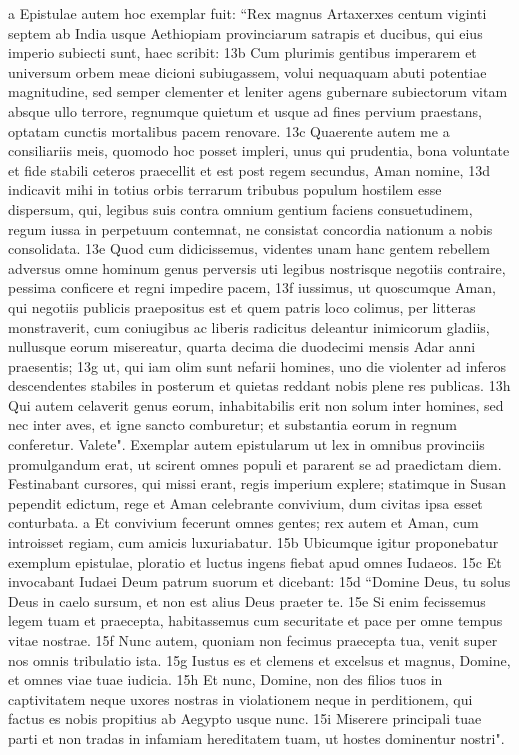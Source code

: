 \begin{biblechapter}
\verse a Epistulae autem hoc exemplar fuit: “Rex magnus Artaxerxes centum viginti septem ab India usque Aethiopiam provinciarum satrapis et ducibus, qui eius imperio subiecti sunt, haec scribit: 13b Cum plurimis gentibus imperarem et universum orbem meae dicioni subiugassem, volui nequaquam abuti potentiae magnitudine, sed semper clementer et leniter agens gubernare subiectorum vitam absque ullo terrore, regnumque quietum et usque ad fines pervium praestans, optatam cunctis mortalibus pacem renovare. 13c Quaerente autem me a consiliariis meis, quomodo hoc posset impleri, unus qui prudentia, bona voluntate et fide stabili ceteros praecellit et est post regem secundus, Aman nomine, 13d indicavit mihi in totius orbis terrarum tribubus populum hostilem esse dispersum, qui, legibus suis contra omnium gentium faciens consuetudinem, regum iussa in perpetuum contemnat, ne consistat concordia nationum a nobis consolidata. 13e Quod cum didicissemus, videntes unam hanc gentem rebellem adversus omne hominum genus perversis uti legibus nostrisque negotiis contraire, pessima conficere et regni impedire pacem, 13f iussimus, ut quoscumque Aman, qui negotiis publicis praepositus est et quem patris loco colimus, per litteras monstraverit, cum coniugibus ac liberis radicitus deleantur inimicorum gladiis, nullusque eorum misereatur, quarta decima die duodecimi mensis Adar anni praesentis; 13g ut, qui iam olim sunt nefarii homines, uno die violenter ad inferos descendentes stabiles in posterum et quietas reddant nobis plene res publicas. 13h Qui autem celaverit genus eorum, inhabitabilis erit non solum inter homines, sed nec inter aves, et igne sancto comburetur; et substantia eorum in regnum conferetur. Valete". 
\verse Exemplar autem epistularum ut lex in omnibus provinciis promulgandum erat, ut scirent omnes populi et pararent se ad praedictam diem. 
\verse Festinabant cursores, qui missi erant, regis imperium explere; statimque in Susan pependit edictum, rege et Aman celebrante convivium, dum civitas ipsa esset conturbata.  
\verse a Et convivium fecerunt omnes gentes; rex autem et Aman, cum introisset regiam, cum amicis luxuriabatur. 15b Ubicumque igitur proponebatur exemplum epistulae, ploratio et luctus ingens fiebat apud omnes Iudaeos. 15c Et invocabant Iudaei Deum patrum suorum et dicebant: 15d “Domine Deus, tu solus Deus in caelo sursum, et non est alius Deus praeter te. 15e Si enim fecissemus legem tuam et praecepta, habitassemus cum securitate et pace per omne tempus vitae nostrae. 15f Nunc autem, quoniam non fecimus praecepta tua, venit super nos omnis tribulatio ista. 15g Iustus es et clemens et excelsus et magnus, Domine, et omnes viae tuae iudicia. 15h Et nunc, Domine, non des filios tuos in captivitatem neque uxores nostras in violationem neque in perditionem, qui factus es nobis propitius ab Aegypto usque nunc. 15i Miserere principali tuae parti et non tradas in infamiam hereditatem tuam, ut hostes dominentur nostri". 
\end{biblechapter}

